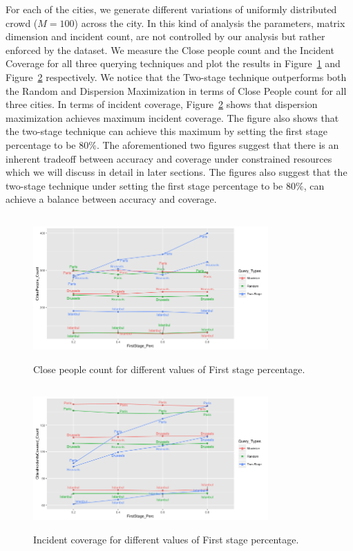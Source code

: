 \documentclass{acm_proc_article-sp}
\begin{document}
For each of the cities, we generate different variations of uniformly distributed crowd ($M = 100$) across the city. In this kind of analysis the parameters, matrix dimension and incident count, are not controlled by our analysis but rather enforced by the dataset. We measure the Close people count and the Incident Coverage for all three querying techniques and plot the results in Figure~\ref{fig: hollaCloseCount} and Figure~\ref{fig: hollaIncCoverage} respectively. We notice that the Two-stage technique outperforms both the Random and Dispersion Maximization in terms of Close People count for all three cities. In terms of incident coverage, Figure~\ref{fig: hollaIncCoverage} shows that dispersion maximization achieves maximum incident coverage. The figure also shows that the two-stage technique can achieve this maximum by setting the first stage percentage to be $80\%$. The aforementioned two figures suggest that there is an inherent tradeoff between accuracy and coverage under constrained resources which we will discuss in detail in later sections. The figures also suggest that the two-stage technique under setting the first stage percentage to be $80\%$, can achieve a balance between accuracy and coverage.



\begin{figure}[!h]
\centering
  \includegraphics[width=9cm ,height=5.5cm]{figuresPng/hollaCloseCnt.png}
  \caption{Close people count for different values of First stage percentage. }
  \label{fig: hollaCloseCount}
\end{figure}
\begin{figure}[!h]
\centering
  \includegraphics[width=9cm ,height=5.5cm]{figuresPng/citiesInc.png}
  \caption{Incident coverage for different values of First stage percentage. }
  \label{fig: hollaIncCoverage}
\end{figure}
\end{document}
